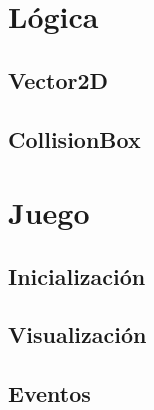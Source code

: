 \documentclass[parskip=half*]{scrartcl}
\begin{document}
\newpage
\section{L\'ogica}
	\subsection{Vector2D}

	\subsection{CollisionBox}

\newpage
\section{Juego}
	\subsection{Inicializaci\'on}

	\subsection{Visualizaci\'on}

	\subsection{Eventos}

\end{document}
